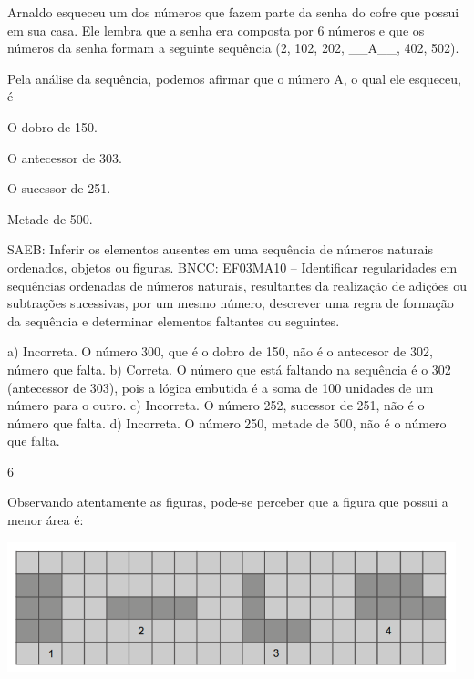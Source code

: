 \begin{multicols}{2}
\begin{enumerate}
{Arnaldo esqueceu um dos números que fazem parte da senha do cofre que
possui em sua casa. Ele lembra que a senha era composta por 6 números e
que os números da senha formam a seguinte sequência (2, 102, 202,
\_\_A\_\_, 402, 502).

Pela análise da sequência, podemos afirmar que o número A, o qual ele esqueceu, é

\begin{escolha}

\item
  O dobro de 150.
\item
  O antecessor de 303.
\item
  O sucessor de 251.
\item
  Metade de 500.
\end{escolha}

SAEB: Inferir os elementos ausentes em uma sequência de
números naturais ordenados, objetos ou figuras.
BNCC: EF03MA10 -- Identificar regularidades em sequências ordenadas de números naturais,
resultantes da realização de adições ou subtrações sucessivas, por um mesmo número,
descrever uma regra de formação da sequência e determinar elementos faltantes ou seguintes.

a) Incorreta. O número 300, que é o dobro de 150, não é o antecesor de 302, número que falta.
b) Correta. O número que está faltando na sequência é o 302 (antecessor de 303), pois a lógica embutida é a soma de 100 unidades de um número para o outro.
c) Incorreta. O número 252, sucessor de 251, não é o número que falta.
d) Incorreta. O número 250, metade de 500, não é o número que falta.

\num{6}

Observando atentamente as figuras, pode-se perceber que a figura que possui a menor área é:


\includegraphics[width=5.12179in,height=1.48342in]{media/image133.png}

\begin{escolha}


\end{escolha}}
\end{enumerate}
\end{multicols}
